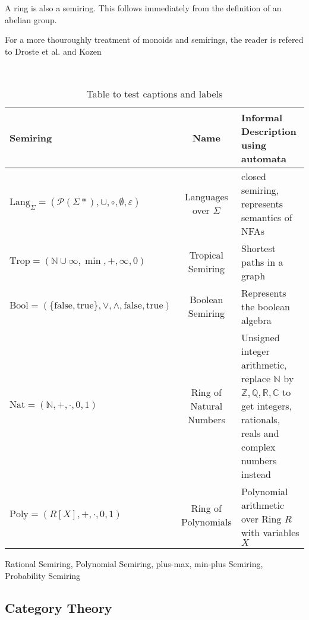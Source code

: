             \begin{note}
            A ring is also a semiring. This follows immediately from the definition of an abelian group.
            \end{note}
            
            For a more thouroughly treatment of monoids and semirings, the reader is refered to Droste et al. and Kozen~\autocite{HWA, CS}
                        
            \begin{example}~\autocite{WA}
                
                \begin{table}[htp]
                \centering
                \begin{tabular}{|l|c|p{6cm}|} 
                \hline
                Semiring & Name & Informal Description using automata \\ [0.5ex] 
                \hline\hline
                $\text{Lang}_{\Sigma}=(\mathcal{P}(\Sigma*), \cup, \circ, \emptyset, \varepsilon)$ & Languages over $\Sigma$ & closed semiring, represents semantics of NFAs \\ 
                $\text{Trop}=(\mathbb{N} \cup \infty, \min, +, \infty, 0)$ & Tropical Semiring & Shortest paths in a graph \\ 
                $\text{Bool}=(\{ \text{false}, \text{true}\}, \vee, \wedge, \text{false}, \text{true})$ & Boolean Semiring & Represents the boolean algebra \\ 
                $\text{Nat}=(\mathbb{N}, +, \cdot, 0, 1)$ & Ring of Natural Numbers & Unsigned integer arithmetic, replace $\mathbb{N}$ by $\mathbb{Z}, \mathbb{Q}, \mathbb{R}, \mathbb{C}$ to get integers, rationals, reals and complex numbers instead \\ 
                $\text{Poly}=(R[X], +, \cdot, 0, 1)$ & Ring of Polynomials & Polynomial arithmetic over Ring $R$ with variables $X$ \\ 
                
                
                \hline
                \end{tabular}
                \caption{Table to test captions and labels}
                \label{table:1}
                \end{table}
Rational Semiring, Polynomial Semiring, plus-max, min-plus Semiring, Probability Semiring
            \end{example}

        \subsection{Category Theory}
        

